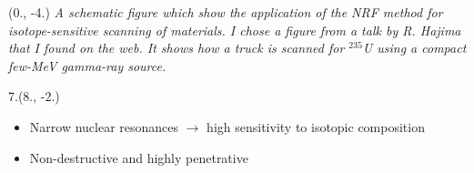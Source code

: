 



\begin{textblock}{7.5}(0., -4.)
    \textit{A schematic figure which show the application of the NRF method for isotope-sensitive scanning of materials.
    I chose a figure from a talk by R. Hajima that I found on the web.
    It shows how a truck is scanned for $^{235}$U using a compact few-MeV gamma-ray source.}
\end{textblock}

\begin{textblock}{7.}(8., -2.)
    \begin{itemize}
        \item Narrow nuclear resonances $\to$ high sensitivity to isotopic composition
        \item Non-destructive and highly penetrative
    \end{itemize}
\end{textblock}